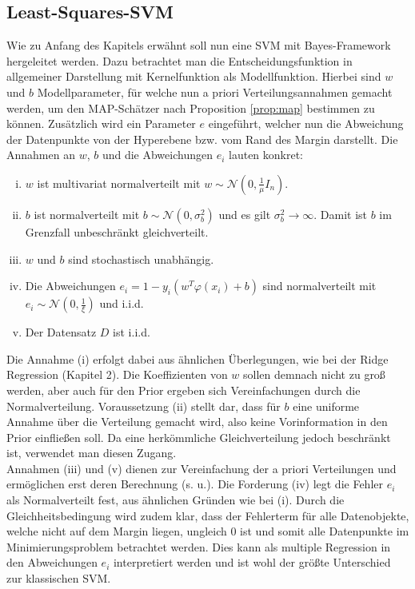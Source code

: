 \subsection{Least-Squares-SVM}

Wie zu Anfang des Kapitels erwähnt soll nun eine SVM mit Bayes-Framework hergeleitet werden. Dazu betrachtet man die Entscheidungsfunktion in allgemeiner Darstellung mit Kernelfunktion als Modellfunktion. Hierbei sind \(w\) und \(b\) Modellparameter, für welche nun a priori Verteilungsannahmen gemacht werden, um den MAP-Schätzer nach Proposition \autoref{prop:map} bestimmen zu können. Zusätzlich wird ein Parameter \(e\) eingeführt, welcher nun die Abweichung der Datenpunkte von der Hyperebene bzw. vom Rand des Margin darstellt. Die Annahmen an \(w\), \(b\) und die Abweichungen \(e_i\) lauten konkret:
\begin{enumerate}[(i)]
	\item \(w\) ist multivariat normalverteilt mit \(w\sim\mathcal{N}\left(0,\frac{1}{\mu}I_{n}\right)\).
	\item \(b\) ist normalverteilt mit \(b\sim\mathcal{N}\left(0,\sigma_b^2\right)\) und es gilt \(\sigma_b^2\rightarrow\infty\). Damit ist \(b\) im Grenzfall unbeschränkt gleichverteilt.
	\item \(w\) und \(b\) sind stochastisch unabhängig.
	\item Die Abweichungen \(e_i=1-y_i\left(w^T\varphi\left(x_i\right)+b\right)\) sind normalverteilt mit \(e_i\sim\mathcal{N}\left(0,\frac{1}{\xi}\right)\) und i.i.d.
	\item Der Datensatz \(D\) ist i.i.d.
\end{enumerate}
Die Annahme (i) erfolgt dabei aus ähnlichen Überlegungen, wie bei der Ridge Regression (Kapitel 2). Die Koeffizienten von \(w\) sollen demnach nicht zu groß werden, aber auch für den Prior ergeben sich Vereinfachungen durch die Normalverteilung.
Voraussetzung (ii) stellt dar, dass für \(b\) eine uniforme Annahme über die Verteilung gemacht wird, also keine Vorinformation in den Prior einfließen soll. Da eine herkömmliche Gleichverteilung jedoch beschränkt ist, verwendet man diesen Zugang.\\
Annahmen (iii) und (v) dienen zur Vereinfachung der a priori Verteilungen und ermöglichen erst deren Berechnung (s. u.). Die Forderung (iv) legt die Fehler \(e_i\) als Normalverteilt fest, aus ähnlichen Gründen wie bei (i). Durch die Gleichheitsbedingung wird zudem klar, dass der Fehlerterm für alle Datenobjekte, welche nicht auf dem Margin liegen, ungleich 0 ist und somit alle Datenpunkte im Minimierungsproblem betrachtet werden. Dies kann als multiple Regression in den Abweichungen \(e_i\) interpretiert werden und ist wohl der größte Unterschied zur klassischen SVM.\\
